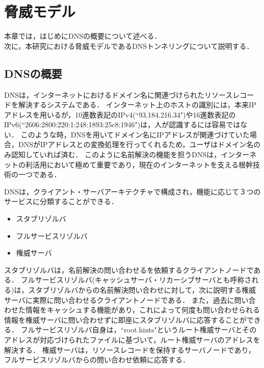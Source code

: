 \section{脅威モデル}
\label{sec:dns-tunneling}
本章では，はじめにDNSの概要について述べる．\\
次に，本研究における脅威モデルであるDNSトンネリングについて説明する．

\subsection{DNSの概要}
\label{sec:dns-protocol}

DNSは，インターネットにおけるドメイン名に関連づけられたリソースレコードを解決するシステムである．
インターネット上のホストの識別には，本来IPアドレスを用いるが，10進数表記のIPv4(``93.184.216.34")や16進数表記のIPv6(``2606:2800:220:1:248:1893:25c8:1946")は，人が認識するには容易ではない．
このような時，DNSを用いてドメイン名にIPアドレスが関連づけていた場合，DNSがIPアドレスとの変換処理を行ってくれるため，ユーザはドメイン名のみ認知していれば済む．
このように名前解決の機能を担うDNSは，インターネットの利活用において極めて重要であり，現在のインターネットを支える根幹技術の一つである．

DNSは，クライアント・サーバアーキテクチャで構成され，機能に応じて３つのサービスに分類することができる．
\begin{itemize}
 \item スタブリゾルバ
 \vspace{-3mm}
 \item フルサービスリゾルバ
 \vspace{-3mm}
 \item 権威サーバ
\end{itemize}

スタブリゾルバは，名前解決の問い合わせるを依頼するクライアントノードである．
フルサービスリゾルバ(キャッシュサーバ・リカーシブサーバとも呼称される)は，スタブリゾルバからの名前解決問い合わせに対して，次に説明する権威サーバに実際に問い合わせるクライアントノードである．
また，過去に問い合わせた情報をキャッシュする機能があり，これによって何度も問い合わせられる情報を権威サーバに問い合わせずに即座にスタブリゾルバに応答することができる．
フルサービスリゾルバ自身は，``root.hints"というルート権威サーバとそのアドレスが対応づけられたファイルに基づいて，ルート権威サーバのアドレスを解決する．
権威サーバは，リソースレコードを保持するサーバノードであり，フルサービスリゾルバからの問い合わせ依頼に応答する．

